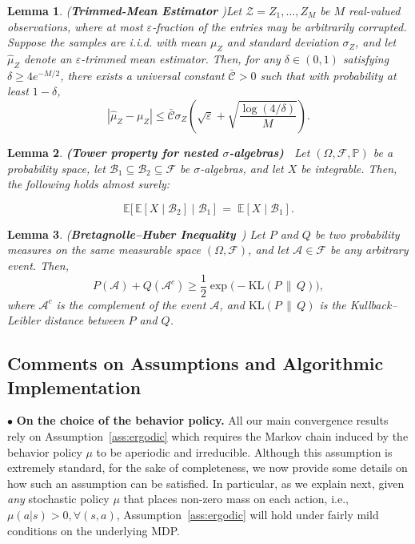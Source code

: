 \documentclass{article}
\newcommand{\mc}{\mathcal}
\newtheorem{lemma}{Lemma}
\begin{document}
\begin{lemma}(\textbf{Trimmed-Mean Estimator} \cite{lugosi})\label{lemma:trimmed_mean_strong}
Let $\mc{Z} = {Z_1, \dots, Z_M}$ be $M$ real-valued observations, where at most $\varepsilon$-fraction of the entries may be arbitrarily corrupted. Suppose the samples are i.i.d. with mean $\mu_Z$ and standard deviation $\sigma_Z$, and let $\hat{\mu}_Z$ denote an $\varepsilon$-trimmed mean estimator. Then, for any $\delta \in (0,1)$ satisfying $\delta \geq 4 e^{-M/2}$, there exists a universal constant $\mc{\bar{C}} > 0$ such that with probability at least $1 - \delta$,
\begin{equation}
|\hat{\mu}_Z - \mu_Z| \leq \mc{\bar{C}} \sigma_Z \left( \sqrt{\varepsilon} + \sqrt{ \frac{ \log(4/\delta)}{M} } \right).
\end{equation}
\end{lemma}
\fi
\begin{lemma}\textbf{(Tower property for nested \(\sigma\)-algebras)~\cite{durrett}}
\label{lem:tower}
Let $(\Omega,\mathcal{F},\mathbb{P})$ be a probability space, let $\mathcal{B}_1 \subseteq \mathcal{B}_2 \subseteq \mathcal{F}$ be $\sigma$-algebras, and let $X$ be integrable. Then, the following holds almost surely:

\[
\mathbb{E}\big[\,\mathbb{E}[X \mid \mathcal{B}_2] \mid \mathcal{B}_1\,\big]
\;=\;
\mathbb{E}[X \mid \mathcal{B}_1].
\]
\end{lemma}

\begin{lemma}(\textbf{Bretagnolle--Huber Inequality}~\citep[Theorem 14.2]{lattimore2020bandit})
\label{lem:BH}
Let $P$ and $Q$ be two probability measures on the same measurable space $(\Omega,\mathcal{F})$,
and let $\mc{A} \in \mathcal{F}$ be any arbitrary event. Then,
\[
P(\mc{A}) + Q(\mc{A}^c) \ge \frac{1}{2}\exp\!\big(-\textrm{KL}(P\,\|\,Q)\big),
\]
where $\mc{A}^c$ is the complement of the event $\mc{A}$, and $\textrm{KL}(P\,\|\,Q)$ is the Kullback--Leibler distance
between $P$ and $Q$.
\end{lemma}

\newpage
\subsection{Comments on Assumptions and Algorithmic Implementation}
$\bullet$ \textbf{On the choice of the behavior policy.} All our main convergence results rely on Assumption~\ref{ass:ergodic} which requires the Markov chain induced by the behavior policy $\mu$ to be aperiodic and irreducible. Although this assumption is extremely standard, for the sake of completeness, we now provide some details on how such an assumption can be satisfied. In particular, as we explain next, given \emph{any} stochastic policy $\mu$ that places non-zero mass on each action, i.e., $\mu(a|s) > 0, \forall (s,a)$, Assumption~\ref{ass:ergodic} will hold under fairly mild conditions on the underlying MDP. 
\end{document}
